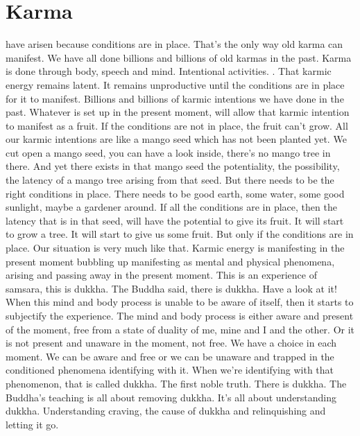 \documentclass[letterpaper,10pt,english]{sphinxmanual}
\begin{document}
\section{Karma}
\label{\detokenize{1-b:karma}}
\sphinxAtStartPar
{}
have arisen because conditions are in place. That’s the only
way old karma can manifest. We have all done billions and billions of old
karmas in the past. Karma is done through body, speech and mind. Intentional activities.
. That karmic energy remains latent.
It remains unproductive until the conditions are in place for it to manifest.
Billions and billions of karmic intentions we have done in the past. Whatever  is  set  up  in  the  present  moment,  will  allow  that  karmic  intention  to
manifest as a fruit. If the conditions are not in place, the fruit can’t grow. All
our karmic intentions are like a mango seed which has not been planted yet.
We cut open a mango seed, you can have a look inside, there’s no mango tree
in there. And yet there exists in that mango seed the potentiality, the possibility, the latency of a mango tree arising from that seed. But there needs to be
the right conditions in place. There needs to be good earth, some water, some
good sunlight, maybe a gardener around. If all the conditions are in place,
then the latency that is in that seed, will have the potential to give its fruit.
It will start to grow a tree. It will start to give us some fruit. But only if the
conditions are in place. Our situation is very much like that. Karmic energy
is  manifesting  in  the  present  moment  bubbling  up  manifesting  as  mental
  and physical phenomena, arising and passing away in the present moment.
This is an experience of samsara, this is dukkha. The Buddha said, there is
dukkha. Have a look at it! When this mind and body process is unable to be
aware of itself, then it starts to subjectify the experience. The mind and body
process is either aware and present of the moment, free from a state of duality of me, mine and I and the other. Or it is not present and unaware in the
moment, not free. We have a choice in each moment. We can be aware and
free or we can be unaware and trapped in the conditioned phenomena identifying with it. When we’re identifying with that phenomenon, that is called
dukkha. The first noble truth. There is dukkha. The Buddha’s teaching is all
about removing dukkha. It’s all about understanding dukkha. Understanding
craving, the cause of dukkha and relinquishing and letting it go.
\end{document}
